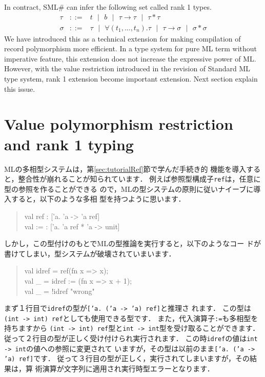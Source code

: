 \documentclass{jbook}
\newif\ifjp
\newcommand{\txt}[2]{#2}
\newcommand{\smlsharp}{SML\#}
\newcommand{\func}{\rightarrow}
\newcommand{\vbar}{\mbox{\ $|$\ }}
\newenvironment{program}{\begin{quote}\begin{tt}}%
                        {\end{tt}\end{quote}}
\begin{document}
	In contract, \smlsharp{} can infer the following set called rank
1 types.
\begin{eqnarray*}
\tau &::=& t \vbar b \vbar \tau \func \tau \vbar \tau * \tau
\\
\sigma &::=& \tau \vbar \forall (t_1,\ldots,t_n).\tau 
\vbar \tau \func \sigma
\vbar \sigma * \sigma 
\end{eqnarray*}
	We have introduced this as a technical extension for making 
compilation of record polymorphism  more efficient.
	In a type system for pure ML term without imperative feature,
this extension does not increase the expressive power of ML.
	However, with the value restriction introduced in the revision
of Standard ML type system, rank 1 extension become important extension.
	Next section explain this issue.
\fi%

\section{\txt{ランク１多相性による値多相性制約の緩和}
{Value polymorphism restriction and rank 1 typing}
}
\label{sec:extensionValuerestriction}

\ifjp%
	MLの多相型システムは，第\ref{sec:tutorialRef}節で学んだ手続き的
機能を導入すると，整合性が崩れることが知られています．
	例えば参照型構成子{\tt ref}は，任意に型の参照を作ることができる
ので，MLの型システムの原則に従いナイーブに導入すると，以下のような多相
型を持つように思います．
\begin{program}
val ref : ['a. 'a -> 'a ref]\\
val := :  ['a. 'a ref * 'a -> unit]
\end{program}
	しかし，この型付けのもとでMLの型推論を実行すると，以下のようなコー
ドが書けてしまい，型システムが破壊されていまいます．
\begin{program}
val idref = ref(fn x => x);\\
val \_ = idref := (fn x => x + 1);\\
val \_ = !idref "wrong"
\end{program}
	まず１行目で{\tt idref}の型が{\tt ['a. ('a -> 'a) ref]}と推理さ
れます．
	この型は{\tt (int -> int) ref}としても使用できる型です．
	また，代入演算子{\tt :=}も多相型を持ちますから
{\tt (int -> int) ref}型と{\tt int -> int}型を受け取ることができます．
	従って２行目の型が正しく受け付けられ実行されます．
	この時{\tt idref}の値は{\tt int -> int}の値への参照に変更されて
いますが，その型は以前のまま{\tt ['a. ('a -> 'a) ref]}です．
	従って３行目の型が正しく，実行されてしまいますが，その結果は，算
術演算が文字列に適用され実行時型エラーとなります．
\end{document}
